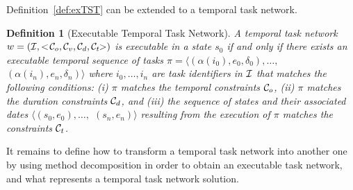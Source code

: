 \documentclass[letterpaper]{article} %
\newtheorem{definition}{Definition}
\newcommand{\name}{\text{\it name}}
\newcommand{\task}{\text{\it task}}
\newcommand{\tn}{\text{\it tn}}
\begin{document}


Definition~\ref{def:exTST} can be extended to a temporal task network.

  \begin{definition}[Executable Temporal Task Network] A temporal task network $w = ({\cal{I}}, <\!{\cal{C}}_o, {\cal{C}}_v, {\cal{C}}_d, {\cal{C}}_t\!\!>)$ is executable in a state $s_0$ if and only if there exists an executable temporal sequence of tasks $\pi = \langle (\alpha(i_0), e_0, \delta_0), \ldots,$ $(\alpha(i_n), e_n, \delta_n)\rangle$  where $i_0, \ldots, i_n$ are task identifiers in $\cal{I}$ that matches the following conditions: (i) $\pi$ matches the temporal constraints ${\cal{C}}_o$, (ii) $\pi$ matches the duration constraints ${\cal{C}}_d$, and (iii) the sequence of states and their associated dates $\langle (s_0, e_0), \ldots,$ $(s_n, e_n) \rangle$ resulting from the execution of $\pi$ matches the constraints ${\cal{C}}_t$.
  \end{definition}

  It remains to define how to transform a temporal task network into another one by using method decomposition in order to obtain an executable task network,
  and what represents a temporal task network solution.
%

\end{document}
